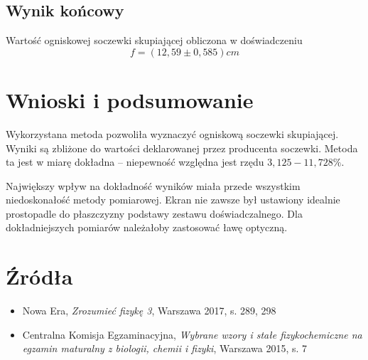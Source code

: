 \documentclass[11pt,oneside,final,notitlepage,a4paper,wide]{mwart}
\begin{document}
	\subsection{Wynik końcowy}	
		Wartość ogniskowej soczewki skupiającej obliczona w doświadczeniu
		\begin{equation}
			f = \left( 12,59 \pm 0,585 \right) cm
		\end{equation}
%
\section{Wnioski i podsumowanie}
	Wykorzystana metoda pozwoliła wyznaczyć ogniskową soczewki skupiającej. Wyniki są zbliżone do wartości deklarowanej przez producenta soczewki. Metoda ta jest w miarę dokładna -- niepewność względna jest rzędu $ 3,125 - 11,728 \% $.
	
	Największy wpływ na dokładność wyników miała przede wszystkim niedoskonałość metody pomiarowej. Ekran nie zawsze był ustawiony idealnie prostopadle do płaszczyzny podstawy zestawu doświadczalnego. Dla dokładniejszych pomiarów należałoby zastosować ławę optyczną.
%
\section{Źródła}
	\begin{itemize}
		\item Nowa Era, \emph{Zrozumieć fizykę 3}, Warszawa 2017, s. 289, 298
		\item Centralna Komisja Egzaminacyjna, \emph{Wybrane wzory i stałe fizykochemiczne na egzamin maturalny z biologii, chemii i fizyki}, Warszawa 2015, s. 7
	\end{itemize}
\end{document}
